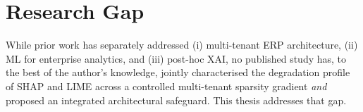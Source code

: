 \section{Research Gap}
\label{sec:lit_gap}

While prior work has separately addressed (i) multi-tenant ERP architecture, (ii) ML for enterprise analytics, and (iii) post-hoc XAI, no published study has, to the best of the author's knowledge, jointly characterised the degradation profile of SHAP and LIME across a controlled multi-tenant sparsity gradient \emph{and} proposed an integrated architectural safeguard. This thesis addresses that gap.
